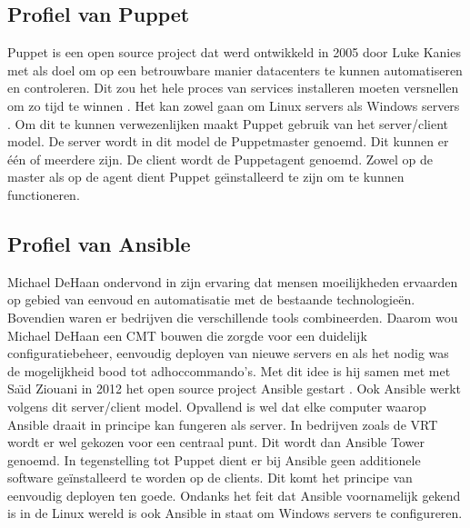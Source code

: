 \subsection{Profiel van Puppet}
Puppet is een open source project dat werd ontwikkeld in 2005 door Luke Kanies \autocite{PuppetLeaders} met als doel om op een betrouwbare manier datacenters te kunnen automatiseren en controleren. Dit zou het hele proces van services installeren moeten versnellen om zo tijd te winnen \autocite{how-puppet-works}. Het kan zowel gaan om Linux servers als Windows servers \autocite{PuppetForWindows}. Om dit te kunnen verwezenlijken maakt Puppet gebruik van  het server/client model. De server wordt in dit model de Puppetmaster genoemd. Dit kunnen er  \'e\'en of meerdere zijn.  De client wordt de Puppetagent genoemd. Zowel op de master als op de agent dient Puppet ge{\"\i}nstalleerd te zijn om te kunnen functioneren. \autocite{puppetdoc} \autocite{puppetfaq}


\subsection{Profiel van Ansible}
Michael DeHaan ondervond in zijn ervaring dat mensen moeilijkheden ervaarden op gebied van eenvoud en automatisatie met de  bestaande technologie\"en. Bovendien waren er bedrijven die verschillende tools combineerden. Daarom wou Michael DeHaan een \gls{CMT} bouwen die zorgde voor een duidelijk configuratiebeheer, eenvoudig deployen van nieuwe servers en als het nodig was de mogelijkheid bood tot \gls{adhoccommando}'s. Met dit idee is hij samen met met Sa{\"\i}d Ziouani in 2012 het open source project Ansible gestart \autocite{ansiblefordevops}. Ook Ansible werkt volgens dit server/client model. Opvallend is wel dat elke computer waarop Ansible draait in principe kan fungeren als server. In bedrijven zoals de VRT wordt er wel gekozen voor een centraal punt. Dit wordt dan Ansible Tower genoemd. In tegenstelling tot Puppet dient er bij Ansible geen additionele software ge\"installeerd te worden op de clients. Dit komt het principe van eenvoudig deployen  ten goede. Ondanks het feit dat Ansible voornamelijk gekend is in de Linux wereld is ook Ansible in staat om Windows servers te configureren. \autocite{ansibleforwindows}









